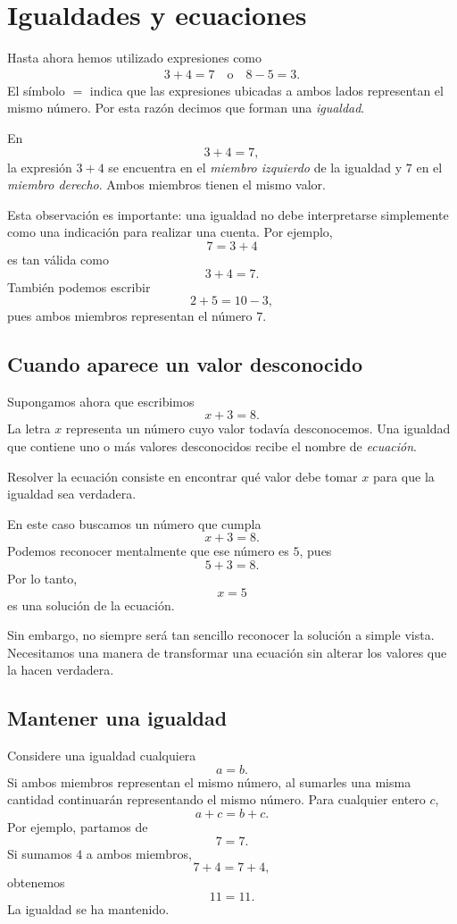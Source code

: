 \section{Igualdades y ecuaciones}

Hasta ahora hemos utilizado expresiones como
\begin{gather*}
3+4=7 \quad
\text{o}\quad
8-5=3.
\end{gather*}
El símbolo \(=\) indica que las expresiones ubicadas a ambos lados representan el mismo número. Por esta razón decimos que forman una \emph{igualdad}.

En
\[
3+4=7,
\]
la expresión \(3+4\) se encuentra en el \emph{miembro izquierdo} de la igualdad y \(7\) en el \emph{miembro derecho}. Ambos miembros tienen el mismo valor.

Esta observación es importante: una igualdad no debe interpretarse simplemente como una indicación para realizar una cuenta. Por ejemplo,
\[
7=3+4
\]
es tan válida como
\[
3+4=7.
\]
También podemos escribir
\[
2+5=10-3,
\]
pues ambos miembros representan el número \(7\).

\subsection{Cuando aparece un valor desconocido}

Supongamos ahora que escribimos
\[
x+3=8.
\]
La letra \(x\) representa un número cuyo valor todavía desconocemos. Una igualdad que contiene uno o más valores desconocidos recibe el nombre de \emph{ecuación}.

Resolver la ecuación consiste en encontrar qué valor debe tomar \(x\) para que la igualdad sea verdadera.

En este caso buscamos un número que cumpla
\[
x+3=8.
\]
Podemos reconocer mentalmente que ese número es \(5\), pues
\[
5+3=8.
\]
Por lo tanto,
\[
x=5
\]
es una solución de la ecuación.

Sin embargo, no siempre será tan sencillo reconocer la solución a simple vista. Necesitamos una manera de transformar una ecuación sin alterar los valores que la hacen verdadera.

\subsection{Mantener una igualdad}

Considere una igualdad cualquiera
\[
a=b.
\]
Si ambos miembros representan el mismo número, al sumarles una misma cantidad continuarán representando el mismo número. Para cualquier entero \(c\),
\[
a+c=b+c.
\]
Por ejemplo, partamos de
\[
7=7.
\]
Si sumamos \(4\) a ambos miembros,
\[
7+4=7+4,
\]
obtenemos
\[
11=11.
\]
La igualdad se ha mantenido.

